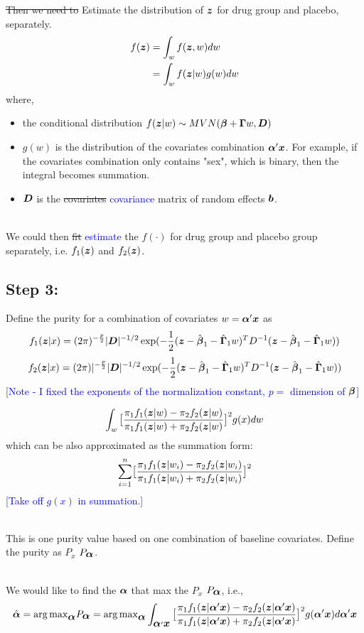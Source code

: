\documentclass[12pt]{article}
\newcommand{\thad}[1]{{\textcolor{blue}{#1}}}
\begin{document}
\st{Then we need to} Estimate the distribution of $\bz$ for drug group and placebo, separately.
$$\begin{aligned}
f(\bz) &= \int_w f(\bz,w) dw \\
 & = \int_w f(\bz|w) g(w) dw
\end{aligned}$$
where,
\begin{itemize}
\item
 the conditional distribution 
$f(\bz|w) \sim MVN( \bbeta + \bGamma w, \bD)$

\item
$g(w)$ is the distribution of the covariates combination $\balpha'\bx$. For example, if the covariates combination only contains "sex", which is binary, then the integral becomes summation.

\item
 $\bD$ is the \st{covariates} \thad{covariance} matrix of random effects $\bb$. 
\end{itemize}
~\\
\noindent
We could then \st{fit} \thad{estimate} the $f(\cdot)$ for drug group and placebo group separately, i.e. $f_1(\bz)$ and $f_2(\bz)$. 

\subsection{Step 3:}

Define the purity for a combination of covariates $w=\balpha'\bx$ as 
$$f_1(\bz|x) = (2\pi)^{-\frac{p}{2}} |\bD|^{-1/2}\exp(-\frac{1}{2} ( \bz - \hat{\bbeta}_1 - \hat{\bGamma}_1 w)^{T} D^{-1} (\bz - \hat{\bbeta}_1  - \hat{\bGamma}_1 w) )$$
$$f_2(\bz|x) = (2\pi)|^{-\frac{p}{2}} |\bD|^{-1/2} \exp(-\frac{1}{2} ( \bz - \hat{\bbeta}_1 - \hat{\bGamma}_1 w)^{T} D^{-1} (\bz - \hat{\bbeta}_1  - \hat{\bGamma}_1 w) )$$
\thad{[Note - I fixed the exponents of the normalization constant, $p=$ dimension of $\bbeta$]}

$$\int_w { \bigl[ {\pi_1 f_1(\bz|w) - \pi_2 f_2(\bz|w) \over \pi_1 f_1(\bz|w) + \pi_2 f_2(\bz|w)} \bigr]^2 g(x) dw} $$
which can be also approximated as the summation form: 
$$\sum_{i=1}^n \bigl[ {\pi_1 f_1(\bz|w_i) - \pi_2 f_2(\bz|w_i) \over \pi_1 f_1(\bz|w_i) + \pi_2 f_2(\bz|w_i)} \bigr]^2 $$
\thad{[Take off $g(x)$ in summation.]}

~\\
\noindent
This is one purity value based on one combination of baseline covariates. Define the purity as \st{$P_x$} \thad{$P_{\balpha}$}.

~\\

\noindent
We would like to find the $\balpha$ that max the \st{$P_x$}
 \thad{$P_{\balpha}$}, i.e.,
 $$\hat{\balpha} = {\arg \max}_{\balpha} P_{\balpha}=
 {\arg \max}_{\balpha}
 \int_{\balpha'\bx} { \bigl[ {\pi_1 f_1(\bz|\balpha'\bx) - \pi_2 f_2(\bz|\balpha'\bx) \over \pi_1 f_1(\bz|\balpha'\bx) + \pi_2 f_2(\bz|\balpha'\bx)} \bigr]^2 g(\balpha'\bx) d\balpha'\bx} $$



\end{document}
